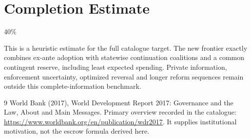\documentclass[11pt]{article}
\theoremstyle{definition}
\begin{document}
\section{Completion Estimate}
40\%

This is a heuristic estimate for the full catalogue target.
The new frontier exactly combines ex-ante adoption with statewise continuation coalitions and a common contingent reserve, including least expected spending. Private information, enforcement uncertainty, optimized reversal and longer reform sequences remain outside this complete-information benchmark.

\begin{thebibliography}{9}
 World Bank (2017), World Development Report 2017: Governance and the Law, About and Main Messages. Primary overview recorded in the catalogue: \url{https://www.worldbank.org/en/publication/wdr2017}. It supplies institutional motivation, not the escrow formula derived here.
\end{thebibliography}
\end{document}
